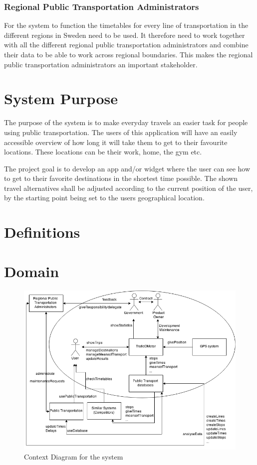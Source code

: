 \documentclass[a4paper]{article}
\begin{document}
			\subsubsection{Regional Public Transportation Administrators}
			For the system to function the timetables for every line of transportation in the different regions in Sweden need to be used. It therefore need to work together with all the different regional public transportation administrators and combine their data to be able to work across regional boundaries. This makes the regional public transportation administrators an important stakeholder.
	
	\section{System Purpose} %
	The purpose of the system is to make everyday travels an easier task for people using public transportation. The users of this application will have an easily accessible overview of how long it will take them to get to their favourite locations. These locations can be their work, home, the gym etc.
	
	
The project goal is to develop an app and/or widget where the user can see how to get to their favorite destinations in the shortest time possible. The shown travel alternatives shall be adjusted according to the current position of the user, by the starting point being set to the users geographical location.
	\section{Definitions}
		
	\section{Domain}
		\begin{figure}[H]
				\includegraphics[scale=0.50]{img/Context-v3.png}
			\caption{Context Diagram for the system}
		\end{figure}
		
\end{document}
